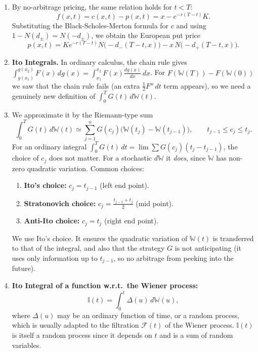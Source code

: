\begin{enumerate}
    \item By no-arbitrage pricing, the same relation holds for $t < T$:
    \[f(x, t) = c(x, t) - p(x, t) = x - e^{-r(T-t)}K.\]
    Substituting the Black-Scholes-Merton formula for $c$ and using $1 - N(d_\pm) = N(-d_\pm)$, we obtain the European put price
    \[p(x, t) = Ke^{-r(T-t)}N\bigl(-d_-(T-t, x)\bigr) - x\, N\bigl(-d_+(T-t, x)\bigr).\]

    \item \textbf{Ito Integrals.} In ordinary calculus, the chain rule gives $\int_{g(x_1)}^{g(x_2)} F(x)\, dg(x) = \int_{x_1}^{x_2} F(x)\frac{dg(x)}{dx}\, dx$. For $F(\mathbb{W}(T)) - F(\mathbb{W}(0))$ we saw that the chain rule fails (an extra $\frac{1}{2}F''\, dt$ term appears), so we need a genuinely new definition of $\int_0^T G(t)\, d\mathbb{W}(t)$.

    \item We approximate it by the Riemann-type sum
    \[\int_0^T G(t)\, d\mathbb{W}(t) \simeq \sum_{j=1}^{n} G(c_j)\bigl(\mathbb{W}(t_j) - \mathbb{W}(t_{j-1})\bigr), \qquad t_{j-1} \leq c_j \leq t_j.\]
    For an ordinary integral $\int_0^T G(t)\, dt = \lim \sum G(c_j)(t_j - t_{j-1})$, the choice of $c_j$ does not matter. For a stochastic $d\mathbb{W}$ it \textit{does}, since $\mathbb{W}$ has non-zero quadratic variation. Common choices:
    \begin{enumerate}
        \item \textbf{Ito's choice:} $c_j = t_{j-1}$ (left end point).
        \item \textbf{Stratonovich choice:} $c_j = \frac{t_{j-1} + t_j}{2}$ (mid point).
        \item \textbf{Anti-Ito choice:} $c_j = t_j$ (right end point).
    \end{enumerate}
    We use Ito's choice. It ensures the quadratic variation of $\mathbb{W}(t)$ is transferred to that of the integral, and also that the strategy $G$ is not anticipating (it uses only information up to $t_{j-1}$, so no arbitrage from peeking into the future).

    \item \textbf{Ito Integral of a function w.r.t.\ the Wiener process:}
    \[\mathbb{I}(t) = \int_0^t \Delta(u)\, d\mathbb{W}(u),\]
    where $\Delta(u)$ may be an ordinary function of time, or a random process, which is usually adapted to the filtration $\mathcal{F}(t)$ of the Wiener process. $\mathbb{I}(t)$ is itself a random process since it depends on $t$ and is a sum of random variables.


\end{enumerate}

